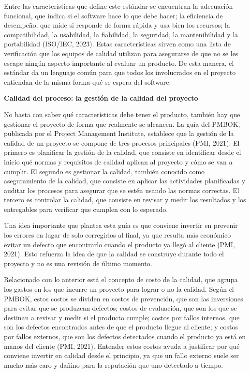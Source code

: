 \documentclass[12pt,letterpaper]{article}
\newcommand{\subtitulo}[1]{\vspace{12pt}\noindent\textbf{#1}\par\vspace{10pt}}
\begin{document}
Entre las características que define este estándar se encuentran la adecuación funcional, que indica si el software hace lo que debe hacer; la eficiencia de desempeño, que mide si responde de forma rápida y usa bien los recursos; la compatibilidad, la usabilidad, la fiabilidad, la seguridad, la mantenibilidad y la portabilidad (ISO/IEC, 2023). Estas características sirven como una lista de verificación que los equipos de calidad utilizan para asegurarse de que no se les escape ningún aspecto importante al evaluar un producto. De esta manera, el estándar da un lenguaje común para que todos los involucrados en el proyecto entiendan de la misma forma qué se espera del software.

\subtitulo{Calidad del proceso: la gestión de la calidad del proyecto}
No basta con saber qué características debe tener el producto, también hay que gestionar el proyecto de forma que realmente se alcancen. La guía del PMBOK, publicada por el Project Management Institute, establece que la gestión de la calidad de un proyecto se compone de tres procesos principales (PMI, 2021). El primero es planificar la gestión de la calidad, que consiste en identificar desde el inicio qué normas y requisitos de calidad aplican al proyecto y cómo se van a cumplir. El segundo es gestionar la calidad, también conocido como aseguramiento de la calidad, que consiste en aplicar las actividades planificadas y auditar los procesos para asegurar que se estén usando las normas correctas. El tercero es controlar la calidad, que consiste en revisar y medir los resultados y los entregables para verificar que cumplen con lo esperado.

Una idea importante que plantea esta guía es que conviene invertir en prevenir los errores en lugar de solo corregirlos al final, ya que resulta más económico evitar un defecto que encontrarlo cuando el producto ya llegó al cliente (PMI, 2021). Esto refuerza la idea de que la calidad se construye durante todo el proyecto y no es una revisión de último momento.

Relacionado con lo anterior está el concepto de costo de la calidad, que agrupa los gastos en los que incurre un proyecto para lograr o no la calidad. Según el PMBOK, estos costos se dividen en costos de prevención, que son las inversiones para evitar que se produzcan defectos; costos de evaluación, que son los que se destinan a revisar y medir si el producto cumple; costos por fallos internos, que son los defectos encontrados antes de que el producto llegue al cliente; y costos por fallos externos, que son los defectos detectados cuando el producto ya está en manos del cliente (PMI, 2021). Entender estos costos ayuda a justificar por qué conviene invertir en calidad desde el principio, ya que un fallo externo suele ser mucho más caro y dañino para la reputación que uno detectado a tiempo.
\end{document}
